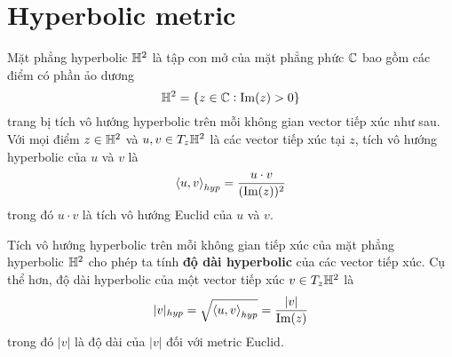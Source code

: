 \section{Hyperbolic metric}
\begin{defn}
    Mặt phẳng hyperbolic $\mathbb{H}^2$ là tập con mở của mặt phẳng phức $\mathbb{C}$ bao gồm các điểm có phần ảo dương
    \[\mathbb{H}^2=\{z\in \mathbb{C}: \operatorname{Im}(z)>0\}\]
    trang bị tích vô hướng hyperbolic trên mỗi không gian vector tiếp xúc như sau. Với mọi điểm $z\in \mathbb{H}^2$ và $u,v \in T_z\mathbb{H}^2$ là các vector tiếp xúc tại $z$, tích vô hướng hyperbolic của $u$ và $v$ là 
    \[\left<u,v\right>_{hyp}=\dfrac{u\cdot v}{(\operatorname{Im}(z))^2}\]
    trong đó $u\cdot v$ là tích vô hướng Euclid của $u$ và $v$.
\end{defn}
Tích vô hướng hyperbolic trên mỗi không gian tiếp xúc của mặt phẳng hyperbolic $\mathbb{H}^2$ cho phép ta tính \textbf{độ dài hyperbolic} của các vector tiếp xúc. Cụ thể hơn, độ dài hyperbolic của một vector tiếp xúc $v\in T_z\mathbb{H}^2$ là 
\[|v|_{hyp}=\sqrt{\left<u,v\right>_{hyp}} = \dfrac{|v|}{\operatorname{Im}(z)}\]
trong đó $|v|$ là độ dài của $|v|$ đối với metric Euclid.

